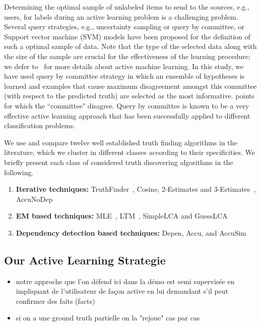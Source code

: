 Determining the optimal sample of unlabeled items to send to the sources, e.g., users, for labels during an active learning problem is a challenging problem.
Several query strategies, e.g., uncertainty sampling or query by committee, or Support vector machine (SVM) models have been proposed for the definition of such a optimal sample of data. Note that 
the type of the selected data along with the size of the sample are crucial for the effectiveness of the learning procedure; we defer to~\cite{burr12} for more details about active machine learning. 
In this study, we have used query by committee strategy in which an ensemble of hypotheses is learned and examples that cause maximum disagreement amongst this
committee (with respect to the predicted truth) are selected as the most informative. 
points for which the ``committee" disagree. Query by committee is known to be a very effective active learning approach that has been successfully applied to different classification problems.



We use and compare twelve well established truth finding algorithms in the literature,
which we cluster in different classes according to their specificities.
We briefly present each class of considered truth discovering algorithms in the following.

\begin{enumerate}
 \item \textbf{Iterative techniques:} TruthFinder~\cite{YinHY08}, Cosine, 2-Estimates and 3-Estimates~\cite{GallandAMS10}, 
 AccuNoDep~\cite{DongBS09}
 \item \textbf{EM based techniques:} MLE~\cite{WangKLA12}, LTM~\cite{ZhaoRGH12}, SimpleLCA and GuessLCA~\cite{PasternackR13}
 \item \textbf{Dependency detection based techniques:} Depen, Accu, and AccuSim~\cite{DongBS09}
\end{enumerate}



\subsection{Our Active Learning Strategie}
\begin{itemize}
 \item notre approche que l'on défend ici dans la démo est  semi supervisée en impliquant de l'utilisateur de façon active
en lui demandant s'il peut confirmer des faits (facts)
\item si on a une ground truth partielle on la "rejoue" cas par cas
\end{itemize}

